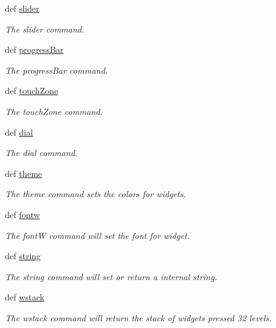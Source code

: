 \begin{DoxyCompactItemize}
def \hyperlink{group___widgets_gafce5d2b8d149e7d84a27ca9740baefe3}{slider}
\begin{DoxyCompactList}\small\item\em The slider command. \end{DoxyCompactList}\item 
def \hyperlink{group___widgets_ga1e17ba92ebcd90504fdc0f8fddb84bf0}{progress\-Bar}
\begin{DoxyCompactList}\small\item\em The progress\-Bar command. \end{DoxyCompactList}\item 
def \hyperlink{group___widgets_ga7a2150ae399ca581088ac55f421731cb}{touch\-Zone}
\begin{DoxyCompactList}\small\item\em The touch\-Zone command. \end{DoxyCompactList}\item 
def \hyperlink{group___widgets_ga8691bfb0f80929f4b4e09a83697532b8}{dial}
\begin{DoxyCompactList}\small\item\em The dial command. \end{DoxyCompactList}\item 
def \hyperlink{group___widgets_gacdc1a0697e6d5777b4d77bfc5247f0bf}{theme}
\begin{DoxyCompactList}\small\item\em The theme command sets the colors for widgets. \end{DoxyCompactList}\item 
def \hyperlink{group___widgets_gad527fa9cb9cda35802e26af7e1870f96}{fontw}
\begin{DoxyCompactList}\small\item\em The font\-W command will set the font for widget. \end{DoxyCompactList}\item 
def \hyperlink{group___widgets_ga606e61e5ba0ea6ae6ada021e7c021b39}{string}
\begin{DoxyCompactList}\small\item\em The string command will set or return a internal string. \end{DoxyCompactList}\item 
def \hyperlink{group___widgets_ga70b40969e280a9c315b84c18848309ca}{wstack}
\begin{DoxyCompactList}\small\item\em The wstack command will return the stack of widgets pressed 32 levels. \end{DoxyCompactList}\item 

\end{DoxyCompactItemize}
